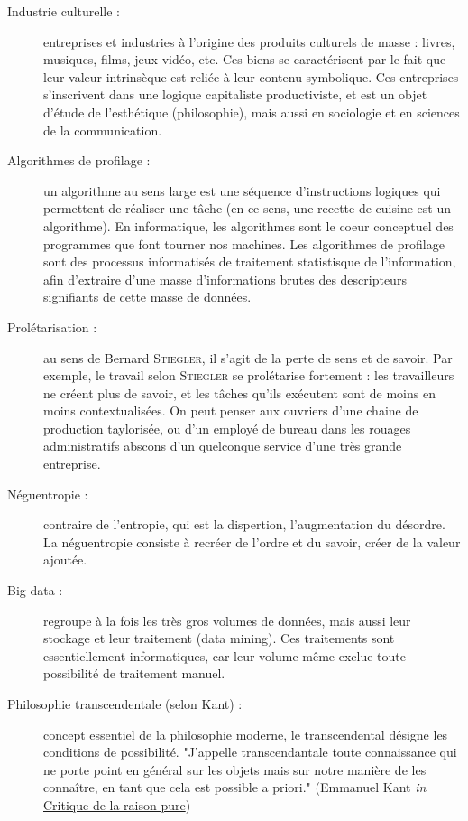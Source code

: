 \documentclass[a4paper,10pt]{article}
\begin{document}
\begin{description}
		\item[Industrie culturelle :] entreprises et industries à l'origine des produits culturels de masse : livres, musiques, films, jeux vidéo, etc. Ces biens se caractérisent par le fait que leur valeur intrinsèque est reliée à leur contenu symbolique. Ces entreprises s'inscrivent dans une logique capitaliste productiviste, et est un objet d'étude de l'esthétique (philosophie), mais aussi en sociologie et en sciences de la communication.
		\item[Algorithmes de profilage :] un algorithme au sens large est une séquence d'instructions logiques qui permettent de réaliser une tâche (en ce sens, une recette de cuisine est un algorithme). En informatique, les algorithmes sont le coeur conceptuel des programmes que font tourner nos machines. Les algorithmes de profilage sont des processus informatisés de traitement statistisque de l'information, afin d'extraire d'une masse d'informations brutes des descripteurs signifiants de cette masse de données.
		\item[Prolétarisation :] au sens de Bernard \textsc{Stiegler}, il s'agit de la perte de sens et de savoir. Par exemple, le travail selon \textsc{Stiegler} se prolétarise fortement : les travailleurs ne créent plus de savoir, et les tâches qu'ils exécutent sont de moins en moins contextualisées. On peut penser aux ouvriers d'une chaine de production taylorisée, ou d'un employé de bureau dans les rouages administratifs abscons d'un quelconque service d'une très grande entreprise.
		\item[Néguentropie :] contraire de l'entropie, qui est la dispertion, l'augmentation du désordre. La néguentropie consiste à recréer de l'ordre et du savoir, créer de la valeur ajoutée.
		\item[Big data :] regroupe à la fois les très gros volumes de données, mais aussi leur stockage et leur traitement (data mining). Ces traitements sont essentiellement informatiques, car leur volume même exclue toute possibilité de traitement manuel.
		\item[Philosophie transcendentale (selon Kant) :] concept essentiel de la philosophie moderne, le transcendental désigne les conditions de possibilité. "J'appelle transcendantale toute connaissance qui ne porte point en général sur les objets mais sur notre manière de les connaître, en tant que cela est possible a priori." (Emmanuel Kant \textit{in} \underline{Critique de la raison pure})
\end{description}
\end{document}
